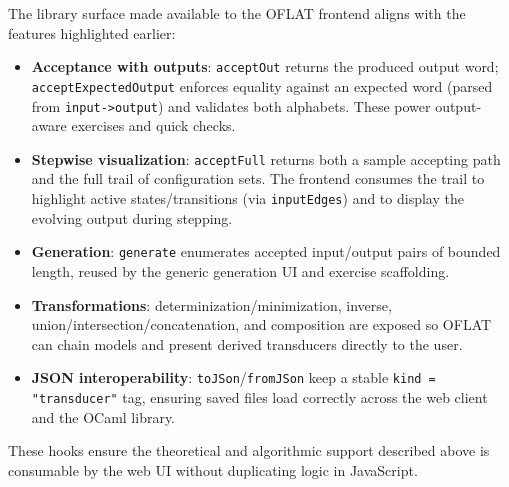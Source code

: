 The library surface made available to the OFLAT frontend aligns with the features highlighted earlier:
\begin{itemize}
  \item \textbf{Acceptance with outputs}: \texttt{acceptOut} returns the produced output word; 
  \texttt{acceptExpectedOutput} enforces equality against an expected word (parsed from \texttt{input->output}) and validates both alphabets. 
  These power output-aware exercises and quick checks.
  \item \textbf{Stepwise visualization}: \texttt{acceptFull} returns both a sample accepting path and the full trail of configuration sets. 
  The frontend consumes the trail to highlight active states/transitions (via \texttt{inputEdges}) 
  and to display the evolving output during stepping.
  \item \textbf{Generation}: \texttt{generate} enumerates accepted input/output pairs of bounded length, reused by the generic 
  generation UI and exercise scaffolding.
  \item \textbf{Transformations}: determinization/minimization, inverse, union/intersection/concatenation, 
  and composition are exposed so OFLAT can chain models and present derived transducers directly to the user.
  \item \textbf{JSON interoperability}: \texttt{toJSon}/\texttt{fromJSon} keep a stable \texttt{kind = "transducer"} tag, 
  ensuring saved files load correctly across the web client and the OCaml library.
\end{itemize}

These hooks ensure the theoretical and algorithmic support described above is consumable by the web UI without duplicating logic in JavaScript.

